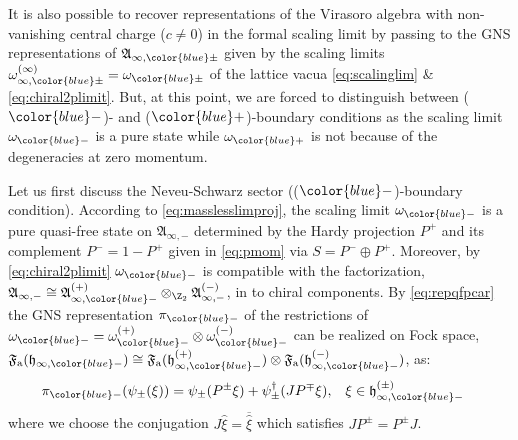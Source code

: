 \documentclass[a4paper, 11pt]{article}
\newcommand{\fA}{\mathfrak{A}}\newcommand{\cA}{\mathcal{A}}\newcommand{\dA}{\mathds{A}}\newcommand{\sA}{\mathscr{A}}
\newcommand{\ua}{\textup a}
\newcommand{\fF}{\mathfrak{F}}\newcommand{\cF}{\mathcal{F}}\newcommand{\dF}{\mathds{F}}\newcommand{\sF}{\mathscr{F}}
\newcommand{\fh}{\mathfrak{h}}
\DeclareMathOperator{\1}{\mathds{1}}
\begin{document}
\medskip

It is also possible to recover representations of the Virasoro algebra with non-vanishing central charge ($c\neq0$) in the formal scaling limit by passing to the GNS representations of $\fA_{\infty,{\color{blue}\pm}}$ given by the scaling limits $\omega^{(\infty)}_{\infty,{\color{blue}\pm}} = \omega_{{\color{blue}\pm}}$ of the lattice vacua \eqref{eq:scalinglim} \& \eqref{eq:chiral2plimit}. But, at this point, we are forced to distinguish between (${\color{blue}-}$)- and (${\color{blue}+}$)-boundary conditions as the scaling limit $\omega_{{\color{blue}-}}$ is a pure state while $\omega_{{\color{blue}+}}$ is not because of the degeneracies at zero momentum.

\medskip

Let us first discuss the Neveu-Schwarz sector ((${\color{blue}-}$)-boundary condition). According to \eqref{eq:masslesslimproj}, the scaling limit $\omega_{{\color{blue}-}}$ is a pure quasi-free state on $\fA_{\infty,-}$ determined by the Hardy projection $P^{+}$ and its complement $P^{-} = 1- P^{+}$ given in \eqref{eq:pmom} via $S = P^{-}\oplus P^{+}$. Moreover, by \eqref{eq:chiral2plimit} $\omega_{{\color{blue}-}}$ is compatible with the factorization, $\fA_{\infty,-}\cong\fA^{(+)}_{\infty,{\color{blue}-}}\otimes_{\Z_{2}}\fA^{(-)}_{\infty,-}$, in to chiral components. By \eqref{eq:repqfpcar} the GNS representation $\pi_{{\color{blue}-}}$ of the restrictions of $\omega_{{\color{blue}-}} = \omega^{(+)}_{{\color{blue}-}}\otimes\omega^{(-)}_{{\color{blue}-}}$ can be realized on Fock space, $\fF_{\ua}(\fh_{\infty,{\color{blue}-}})\cong\fF_{\ua}(\fh^{(+)}_{\infty,{\color{blue}-}})\otimes\fF_{\ua}(\fh^{(-)}_{\infty,{\color{blue}-}})$, as:
\begin{align}
\label{eq:cxrepchi}
\pi_{{\color{blue}-}}(\psi_{\pm}(\xi)) & = \psi_{\pm}(P^{\pm}\xi)+\psi^{\dag}_{\pm}(JP^{\mp}\xi), & \xi & \in\fh^{(\pm)}_{\infty,{\color{blue}-}}
\end{align}
where we choose the conjugation $J\hat{\xi} = \overline{\hat{\xi}}$ which satisfies $JP^{\pm} = P^{\pm}J$.

\medskip
\end{document}
